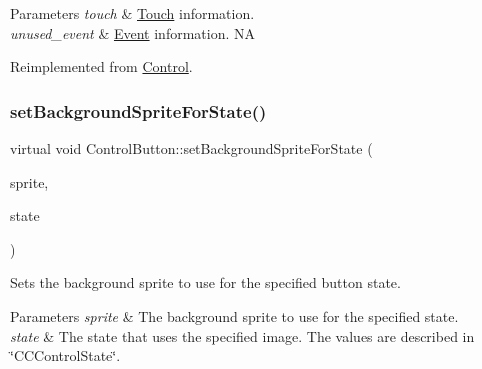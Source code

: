 \begin{DoxyParams}{Parameters}
{\em touch} & \hyperlink{classTouch}{Touch} information. \\
\hline
{\em unused\+\_\+event} & \hyperlink{classEvent}{Event} information.  NA \\
\hline
\end{DoxyParams}


Reimplemented from \hyperlink{classControl_a26d2e6af053319dc605949678f726622}{Control}.

\mbox{\label{classControlButton_a9be0490a60e89847a0c6d69cc65d36f8}} 
\subsubsection{\texorpdfstring{set\+Background\+Sprite\+For\+State()}{setBackgroundSpriteForState()}\hspace{0.1cm}{\footnotesize\ttfamily [1/2]}}
{\footnotesize\ttfamily virtual void Control\+Button\+::set\+Background\+Sprite\+For\+State (\begin{DoxyParamCaption}\item[{cocos2d\+::ui\+::\+Scale9\+Sprite $\ast$}]{sprite,  }\item[{\hyperlink{classControl_a89e9598cd785841ac91cff3c4798c469}{State}}]{state }\end{DoxyParamCaption})\hspace{0.3cm}{\ttfamily [virtual]}}

Sets the background sprite to use for the specified button state.


\begin{DoxyParams}{Parameters}
{\em sprite} & The background sprite to use for the specified state. \\
\hline
{\em state} & The state that uses the specified image. The values are described in \char`\"{}\+C\+C\+Control\+State\char`\"{}. \\
\hline
\end{DoxyParams}
\mbox{\label{classControlButton_a9be0490a60e89847a0c6d69cc65d36f8}} 
